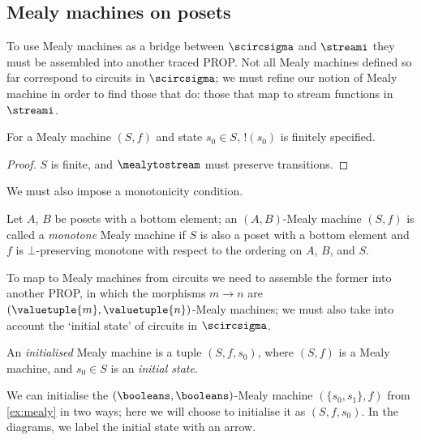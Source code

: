 \documentclass{lmcs}
\begin{document}
\subsection{Mealy machines on posets}

To use Mealy machines as a bridge between \(\scircsigma\) and \(\streami\) they
must be assembled into another traced PROP.
Not all Mealy machines defined so far correspond to circuits in
\(\scircsigma\); we must refine our notion of Mealy machine in order to find
those that do: those that map to stream functions in \(\streami\).

\begin{lem}
    For a Mealy machine \((S, f)\) and state \(s_0 \in S\), \(!(s_0)\)
    is finitely specified.
\end{lem}
\begin{proof}
    \(S\) is finite, and \(\mealytostream\) must preserve transitions.
\end{proof}

We must also impose a monotonicity condition.

\begin{defi}
    Let \(A\), \(B\) be posets with a bottom element; an \((A,B)\)-Mealy machine
    \((S, f)\) is called a \emph{monotone} Mealy machine if \(S\) is also a
    poset with a bottom element and
    \(f\) is \(\bot\)-preserving monotone with respect to the ordering on
    \(A\), \(B\), and \(S\).
\end{defi}

To map to Mealy machines from circuits we need to assemble the former into
another PROP, in which the morphisms \(m \to n\) are
\((\valuetuple{m},\valuetuple{n})\)-Mealy machines; we must also take into
account the `initial state' of circuits in \(\scircsigma\).

\begin{defi}
    An \emph{initialised} Mealy machine is a tuple \((S, f, s_0)\), where
    \((S, f)\) is a Mealy machine, and \(s_0 \in S\) is an \emph{initial state}.
\end{defi}

\begin{exa}\label{ex:mealy-init}
    We can initialise the \((\booleans,\booleans)\)-Mealy machine
    \((\{s_0,s_1\},f)\) from \autoref{ex:mealy} in two ways; here we will choose to
    initialise it as \((S,f,s_0)\).
    In the diagrams, we label the initial state with an arrow.
    \begin{center}
        
    \end{center}
\end{exa}
\end{document}
